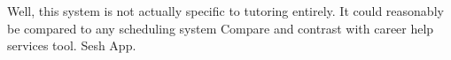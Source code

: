 Well, this system is not actually specific to tutoring entirely.  It
could reasonably be compared to any scheduling system Compare and
contrast with career help services tool.  Sesh App.
